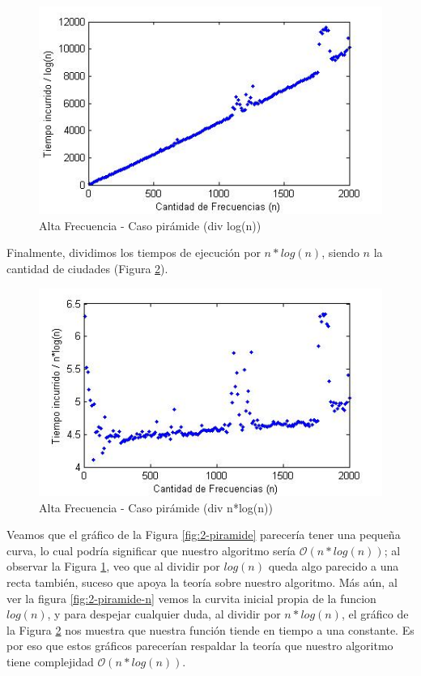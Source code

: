 \begin{figure}[htb]
	\begin{center}
    		\includegraphics[scale=0.5]{imagenes/2-tren-div-logn.jpg}
	\end{center}
	\caption{Alta Frecuencia - Caso pirámide (div log(n))}\label{fig:2-piramide-logn}
\end{figure}
\FloatBarrier

Finalmente, dividimos los tiempos de ejecución por $n*log(n)$, siendo $n$ la cantidad de ciudades (Figura \ref{fig:2-piramide-nlogn}).

\begin{figure}[htb]
	\begin{center}
    		\includegraphics[scale=0.5]{imagenes/2-tren-div-nlogn.jpg}
	\end{center}
	\caption{Alta Frecuencia - Caso pirámide (div n*log(n))}\label{fig:2-piramide-nlogn}
\end{figure}

Veamos que el gráfico de la Figura \ref{fig:2-piramide} parecería tener una pequeña curva, lo cual podría significar que nuestro algoritmo sería $\mathcal{O}(n*log(n))$; al observar la Figura \ref{fig:2-piramide-logn}, veo que al dividir por $log(n)$ queda algo parecido a una recta también, suceso que apoya la teoría sobre nuestro algoritmo. Más aún, al ver la figura \ref{fig:2-piramide-n} vemos la curvita inicial propia de la funcion $log(n)$, y para despejar cualquier duda, al dividir por $n*log(n)$, el gráfico de la Figura \ref{fig:2-piramide-nlogn} nos muestra que nuestra función tiende en tiempo a una constante. Es por eso que estos gráficos parecerían respaldar la teoría que nuestro algoritmo tiene complejidad $\mathcal{O}(n*log(n))$.

\newpage